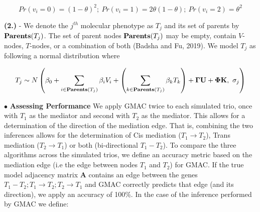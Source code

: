 \documentclass[
]{article}
\begin{document}
\[ Pr(v_i = 0) =(1 -\theta)^2; \ Pr(v_i = 1) = 2\theta(1-\theta); \ Pr(v_i = 2) = \theta^2 \]

\noindent \textbf{(2.)} - We denote the \(j^{th}\) molecular phenotype
as \(T_j\) and its set of parents by \({\bf Parents}(T_j)\). The set of
parent nodes \({\bf Parents}(T_j)\) may be empty, contain \(V\)-nodes,
\(T\)-nodes, or a combination of both (Badsha and Fu, 2019). We model
\(T_j\) as following a normal distribution where

\begin{eqnarray}
 T_j \sim N\left( \beta_0 + \sum_{i\in{\bf Parents}(T_j)} \beta_{i} V_i +\left(\sum_{k\in{\bf Parents}(T_j)} \beta_k T_k\right) + {\bf \Gamma U} + {\bf \Phi K}, \ \sigma_j \right)  
\end{eqnarray}

\begin{figure}
\begin{center}
\end{center}
\end{figure}

\indent \(\bullet\) \textbf{Assessing Performance} We apply GMAC twice
to each simulated trio, once with \(T_1\) as the mediator and second
with \(T_2\) as the mediator. This allows for a determination of the
direction of the mediation edge. That is, combining the two inferences
allows for the determination of Cis mediation (\(T_1 \rightarrow T_2\)),
Trans mediation (\(T_2 \rightarrow T_1\)) or both (bi-directional
\(T_1 - T_2\)). To compare the three algorithms across the simulated
trios, we define an accuracy metric based on the mediation edge (i.e the
edge between nodes \(T_1\) and \(T_2\)) for GMAC. If the true model
adjacency matrix \(\textbf{A}\) contains an edge between the genes
\(T_1 - T_2; T_1 \rightarrow T_2; T_2 \rightarrow T_1\) and GMAC
correctly predicts that edge (and its direction), we apply an accuracy
of 100\%. In the case of the inference performed by GMAC we define:
\end{document}
